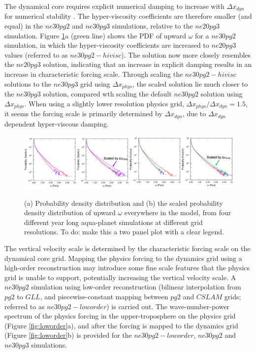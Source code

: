 \documentclass{agujournal}
\begin{document}
The dynamical core requires explicit numerical damping to increase with $\Delta x_{dyn}$ for numerical stability \citep{LetAl2018JAMES}. The hyper-viscosity coefficients are therefore smaller (and equal) in the $ne30pg2$ and $ne30pg3$ simulations, relative to the $ne20pg3$ simulation. Figure \ref{fig:pg2panel}a (green line) shows the PDF of upward $\omega$ for a $ne30pg2$ simulation, in which the hyper-viscosity coefficients are increased to $ne20pg3$ values (referred to as $ne30pg2-hivisc$). The solution now more closely resembles the $ne20pg3$ solution, indicating that an increase in explicit damping results in an increase in characteristic forcing scale. Through scaling the $ne30pg2-hivisc$ solutions to the $ne30pg3$ grid using $\Delta x_{phys}$, the scaled solution lie much closer to the $ne30pg3$ solution, compared wth scaling the default $ne30pg2$ solution using $\Delta x_{phys}$. When using a slightly lower resolution physics grid, $\Delta x_{phys}/\Delta x_{dyn} = 1.5$, it seems the forcing scale is primarily determined by $\Delta x_{dyn}$, due to $\Delta x_{dyn}$ dependent hyper-viscous damping.

\begin{figure}[t]
\begin{center}
\noindent\includegraphics[width=30pc,angle=0]{figs/pdf-panel-hypervisc.png}\\
\end{center}
\caption{(a) Probability density distribution and (b) the scaled probability density distribution of upward $\omega$ everywhere in the model, from four different year long aqua-planet simulations at different grid resolutions. {\color{red}To do: make this a two panel plot with a clear legend.}}
\label{fig:pg2panel}
\end{figure}

The vertical velocity scale is determined by the characteristic forcing scale on the dynamical core grid. Mapping the physics forcing to the dynamics grid using a high-order reconstruction may introduce some fine scale features that the physics grid is unable to support, potentially increasing the vertical velocity scale. A $ne30pg2$ simulation using low-order reconstruction (bilinear interpolation from $pg2$ to $GLL$, and piecewise-constant mapping between $pg2$ and $CSLAM$ grids; referred to as $ne30pg2-loworder$) is carried out. The wave-number-power spectrum of the physics forcing in the upper-troposphere on the physics grid (Figure \ref{fig:loworder}a), and after the forcing is mapped to the dynamics grid (Figure \ref{fig:loworder}b) is provided for the $ne30pg2-loworder$, $ne30pg2$ and $ne30pg3$ simulations. 
\end{document}
